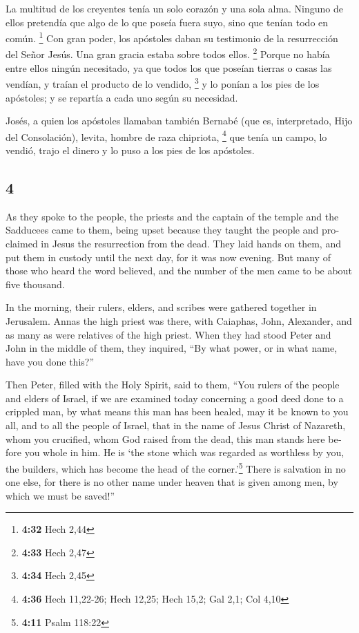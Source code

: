 \begin{paracol}{2}
 La multitud de los creyentes tenía un solo corazón y una
sola alma. Ninguno de ellos pretendía que algo de lo que poseía fuera
suyo, sino que tenían todo en común. \footnote{\textbf{4:32} Hech 2,44}
 Con gran poder, los apóstoles daban su testimonio de la
resurrección del Señor Jesús. Una gran gracia estaba sobre todos ellos.
\footnote{\textbf{4:33} Hech 2,47}  Porque no había entre
ellos ningún necesitado, ya que todos los que poseían tierras o casas
las vendían, y traían el producto de lo vendido, \footnote{\textbf{4:34}
  Hech 2,45}  y lo ponían a los pies de los apóstoles; y
se repartía a cada uno según su necesidad.

 Josés, a quien los apóstoles llamaban también Bernabé
(que es, interpretado, Hijo del Consolación), levita, hombre de raza
chipriota, \footnote{\textbf{4:36} Hech 11,22-26; Hech 12,25; Hech 15,2;
  Gal 2,1; Col 4,10}  que tenía un campo, lo vendió,
trajo el dinero y lo puso a los pies de los apóstoles.

\switchcolumn
\begin{otherlanguage}{english}

\hypertarget{section-7}{%
\section{4}\label{section-7}}

 As they spoke to the people, the priests and the captain
of the temple and the Sadducees came to them,  being upset
because they taught the people and proclaimed in Jesus the resurrection
from the dead.  They laid hands on them, and put them in
custody until the next day, for it was now evening.  But
many of those who heard the word believed, and the number of the men
came to be about five thousand.

 In the morning, their rulers, elders, and scribes were
gathered together in Jerusalem.  Annas the high priest was
there, with Caiaphas, John, Alexander, and as many as were relatives of
the high priest.  When they had stood Peter and John in
the middle of them, they inquired, ``By what power, or in what name,
have you done this?''

 Then Peter, filled with the Holy Spirit, said to them,
``You rulers of the people and elders of Israel,  if we
are examined today concerning a good deed done to a crippled man, by
what means this man has been healed,  may it be known to
you all, and to all the people of Israel, that in the name of Jesus
Christ of Nazareth, whom you crucified, whom God raised from the dead,
this man stands here before you whole in him.  He is `the
stone which was regarded as worthless by you, the builders, which has
become the head of the corner.'\footnote{\textbf{4:11} Psalm 118:22}
 There is salvation in no one else, for there is no other
name under heaven that is given among men, by which we must be saved!''


\end{otherlanguage}
\end{paracol}
